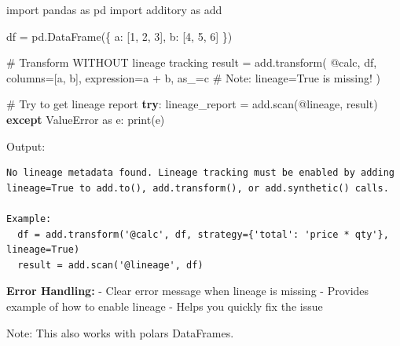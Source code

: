 \documentclass[
  letterpaper,
]{scrbook}
\newenvironment{Shaded}{\begin{snugshade}}{\end{snugshade}}
\newcommand{\BuiltInTok}[1]{\textcolor[rgb]{0.00,0.23,0.31}{#1}}
\newcommand{\CommentTok}[1]{\textcolor[rgb]{0.37,0.37,0.37}{#1}}
\newcommand{\ControlFlowTok}[1]{\textcolor[rgb]{0.00,0.23,0.31}{\textbf{#1}}}
\newcommand{\DecValTok}[1]{\textcolor[rgb]{0.68,0.00,0.00}{#1}}
\newcommand{\ImportTok}[1]{\textcolor[rgb]{0.00,0.46,0.62}{#1}}
\newcommand{\NormalTok}[1]{\textcolor[rgb]{0.00,0.23,0.31}{#1}}
\newcommand{\OperatorTok}[1]{\textcolor[rgb]{0.37,0.37,0.37}{#1}}
\newcommand{\PreprocessorTok}[1]{\textcolor[rgb]{0.68,0.00,0.00}{#1}}
\newcommand{\StringTok}[1]{\textcolor[rgb]{0.13,0.47,0.30}{#1}}
\begin{document}
\begin{Shaded}
\begin{Highlighting}[]
\ImportTok{import}\NormalTok{ pandas }\ImportTok{as}\NormalTok{ pd}
\ImportTok{import}\NormalTok{ additory }\ImportTok{as}\NormalTok{ add}

\NormalTok{df }\OperatorTok{=}\NormalTok{ pd.DataFrame(\{}
    \StringTok{\textquotesingle{}a\textquotesingle{}}\NormalTok{: [}\DecValTok{1}\NormalTok{, }\DecValTok{2}\NormalTok{, }\DecValTok{3}\NormalTok{],}
    \StringTok{\textquotesingle{}b\textquotesingle{}}\NormalTok{: [}\DecValTok{4}\NormalTok{, }\DecValTok{5}\NormalTok{, }\DecValTok{6}\NormalTok{]}
\NormalTok{\})}

\CommentTok{\# Transform WITHOUT lineage tracking}
\NormalTok{result }\OperatorTok{=}\NormalTok{ add.transform(}
    \StringTok{\textquotesingle{}@calc\textquotesingle{}}\NormalTok{,}
\NormalTok{    df,}
\NormalTok{    columns}\OperatorTok{=}\NormalTok{[}\StringTok{\textquotesingle{}a\textquotesingle{}}\NormalTok{, }\StringTok{\textquotesingle{}b\textquotesingle{}}\NormalTok{],}
\NormalTok{    expression}\OperatorTok{=}\StringTok{\textquotesingle{}a + b\textquotesingle{}}\NormalTok{,}
\NormalTok{    as\_}\OperatorTok{=}\StringTok{\textquotesingle{}c\textquotesingle{}}
    \CommentTok{\# Note: lineage=True is missing!}
\NormalTok{)}

\CommentTok{\# Try to get lineage report}
\ControlFlowTok{try}\NormalTok{:}
\NormalTok{    lineage\_report }\OperatorTok{=}\NormalTok{ add.scan(}\StringTok{\textquotesingle{}@lineage\textquotesingle{}}\NormalTok{, result)}
\ControlFlowTok{except} \PreprocessorTok{ValueError} \ImportTok{as}\NormalTok{ e:}
    \BuiltInTok{print}\NormalTok{(e)}
\end{Highlighting}
\end{Shaded}

Output:

\begin{verbatim}
No lineage metadata found. Lineage tracking must be enabled by adding
lineage=True to add.to(), add.transform(), or add.synthetic() calls.

Example:
  df = add.transform('@calc', df, strategy={'total': 'price * qty'}, lineage=True)
  result = add.scan('@lineage', df)
\end{verbatim}

\textbf{Error Handling:} - Clear error message when lineage is missing -
Provides example of how to enable lineage - Helps you quickly fix the
issue

Note: This also works with polars DataFrames.
\end{document}
